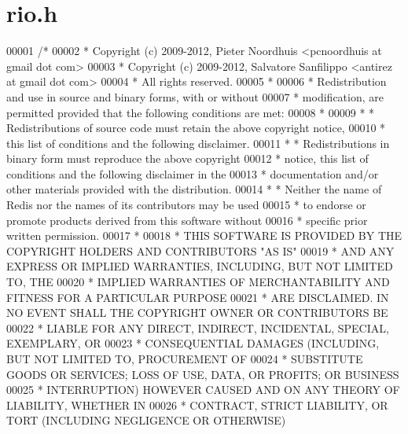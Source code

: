 \hypertarget{rio_8h_source}{}\section{rio.\+h}
\label{rio_8h_source}

\begin{DoxyCode}
00001 \textcolor{comment}{/*}
00002 \textcolor{comment}{ * Copyright (c) 2009-2012, Pieter Noordhuis <pcnoordhuis at gmail dot com>}
00003 \textcolor{comment}{ * Copyright (c) 2009-2012, Salvatore Sanfilippo <antirez at gmail dot com>}
00004 \textcolor{comment}{ * All rights reserved.}
00005 \textcolor{comment}{ *}
00006 \textcolor{comment}{ * Redistribution and use in source and binary forms, with or without}
00007 \textcolor{comment}{ * modification, are permitted provided that the following conditions are met:}
00008 \textcolor{comment}{ *}
00009 \textcolor{comment}{ *   * Redistributions of source code must retain the above copyright notice,}
00010 \textcolor{comment}{ *     this list of conditions and the following disclaimer.}
00011 \textcolor{comment}{ *   * Redistributions in binary form must reproduce the above copyright}
00012 \textcolor{comment}{ *     notice, this list of conditions and the following disclaimer in the}
00013 \textcolor{comment}{ *     documentation and/or other materials provided with the distribution.}
00014 \textcolor{comment}{ *   * Neither the name of Redis nor the names of its contributors may be used}
00015 \textcolor{comment}{ *     to endorse or promote products derived from this software without}
00016 \textcolor{comment}{ *     specific prior written permission.}
00017 \textcolor{comment}{ *}
00018 \textcolor{comment}{ * THIS SOFTWARE IS PROVIDED BY THE COPYRIGHT HOLDERS AND CONTRIBUTORS "AS IS"}
00019 \textcolor{comment}{ * AND ANY EXPRESS OR IMPLIED WARRANTIES, INCLUDING, BUT NOT LIMITED TO, THE}
00020 \textcolor{comment}{ * IMPLIED WARRANTIES OF MERCHANTABILITY AND FITNESS FOR A PARTICULAR PURPOSE}
00021 \textcolor{comment}{ * ARE DISCLAIMED. IN NO EVENT SHALL THE COPYRIGHT OWNER OR CONTRIBUTORS BE}
00022 \textcolor{comment}{ * LIABLE FOR ANY DIRECT, INDIRECT, INCIDENTAL, SPECIAL, EXEMPLARY, OR}
00023 \textcolor{comment}{ * CONSEQUENTIAL DAMAGES (INCLUDING, BUT NOT LIMITED TO, PROCUREMENT OF}
00024 \textcolor{comment}{ * SUBSTITUTE GOODS OR SERVICES; LOSS OF USE, DATA, OR PROFITS; OR BUSINESS}
00025 \textcolor{comment}{ * INTERRUPTION) HOWEVER CAUSED AND ON ANY THEORY OF LIABILITY, WHETHER IN}
00026 \textcolor{comment}{ * CONTRACT, STRICT LIABILITY, OR TORT (INCLUDING NEGLIGENCE OR OTHERWISE)}

\end{DoxyCode}
